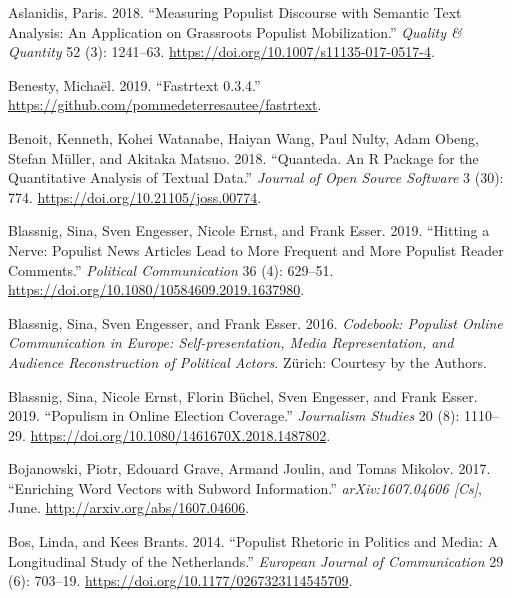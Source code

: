 \documentclass[
]{ccr}
\newlength{\cslhangindent}
\newlength{\cslentryspacingunit} %
\newenvironment{CSLReferences}[2] %
 {%
  \setlength{\parindent}{0pt}
  \ifodd #1
  \let\oldpar\par
  \def\par{\hangindent=\cslhangindent\oldpar}
  \fi
  \setlength{\parskip}{#2\cslentryspacingunit}
 }%
 {}
\begin{document}
\hypertarget{refs}{}
\begin{CSLReferences}{1}{0}
\leavevmode{}%
Aslanidis, Paris. 2018. {``Measuring Populist Discourse with Semantic
Text Analysis: An Application on Grassroots Populist Mobilization.''}
\emph{Quality \& Quantity} 52 (3): 1241--63.
\url{https://doi.org/10.1007/s11135-017-0517-4}.

\leavevmode{}%
Benesty, Michaël. 2019. {``Fastrtext 0.3.4.''}
\url{https://github.com/pommedeterresautee/fastrtext}.

\leavevmode{}%
Benoit, Kenneth, Kohei Watanabe, Haiyan Wang, Paul Nulty, Adam Obeng,
Stefan Müller, and Akitaka Matsuo. 2018. {``Quanteda. {An R} Package for
the Quantitative Analysis of Textual Data.''} \emph{Journal of Open
Source Software} 3 (30): 774. \url{https://doi.org/10.21105/joss.00774}.

\leavevmode{}%
Blassnig, Sina, Sven Engesser, Nicole Ernst, and Frank Esser. 2019.
{``Hitting a Nerve: {Populist} News Articles Lead to More Frequent and
More Populist Reader Comments.''} \emph{Political Communication} 36 (4):
629--51. \url{https://doi.org/10.1080/10584609.2019.1637980}.

\leavevmode{}%
Blassnig, Sina, Sven Engesser, and Frank Esser. 2016. \emph{Codebook:
{Populist} Online Communication in {Europe}: {Self-presentation}, Media
Representation, and Audience Reconstruction of Political Actors}.
{Z{ü}rich}: {Courtesy by the Authors}.

\leavevmode{}%
Blassnig, Sina, Nicole Ernst, Florin Büchel, Sven Engesser, and Frank
Esser. 2019. {``Populism in {Online Election Coverage}.''}
\emph{Journalism Studies} 20 (8): 1110--29.
\url{https://doi.org/10.1080/1461670X.2018.1487802}.

\leavevmode{}%
Bojanowski, Piotr, Edouard Grave, Armand Joulin, and Tomas Mikolov.
2017. {``Enriching Word Vectors with Subword Information.''}
\emph{arXiv:1607.04606 {[}Cs{]}}, June.
\url{http://arxiv.org/abs/1607.04606}.

\leavevmode{}%
Bos, Linda, and Kees Brants. 2014. {``Populist Rhetoric in Politics and
Media: {A} Longitudinal Study of the {Netherlands}.''} \emph{European
Journal of Communication} 29 (6): 703--19.
\url{https://doi.org/10.1177/0267323114545709}.


\end{CSLReferences}
\end{document}
